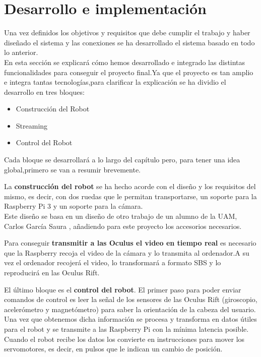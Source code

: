 \documentclass[twoside, 11pt]{epstfg}
\begin{document}
\chapter{Desarrollo e implementación}

Una vez definidos los objetivos y requisitos que debe cumplir el trabajo y haber diseñado el sistema y las conexiones se ha desarrollado el sistema basado en todo lo anterior.\\
En esta sección se explicará cómo hemos desarrollado e integrado las distintas funcionalidades para conseguir el proyecto final.Ya que el proyecto es tan amplio e integra tantas tecnologías,para clarificar la explicación se ha dividio el desarrollo en tres bloques:
\begin{itemize}
	\item Construcción del Robot
	\item Streaming 
	\item Control del Robot
\end{itemize}
Cada bloque se desarrollará a lo largo del capítulo pero, para tener una idea global,primero se van a resumir brevemente.

La \textbf{construcción del robot} se ha hecho acorde con el diseño y los requisitos del mismo, es decir, con dos ruedas que le permitan transportarse, un soporte para la Raspberry Pi 3 y un soporte para la cámara.\\
Este diseño se basa en un diseño de otro trabajo de un alumno de la UAM, Carlos García Saura \cite{garcia2012low}, añadiendo para este proyecto los accesorios necesarios.

Para conseguir \textbf{transmitir a las Oculus el video en tiempo real} es necesario que la Raspberry recoja el video de la cámara y lo transmita al ordenador.A su vez el ordenador recojerá el video, lo transformará a formato SBS y lo reproducirá en las Oculus Rift. 

El último bloque es el \textbf{control del robot}. El primer paso para poder enviar comandos de control es leer la señal de los sensores de las Oculus Rift (giroscopio, acelerómetro y magnetómetro) para saber la orientación de la cabeza del usuario.\\
Una vez que obtenemos dicha información se procesa y transforma en datos útiles para el robot y se transmite a las Raspberry Pi con la mínima latencia posible.\\
Cuando el robot recibe los datos los convierte en instrucciones para mover los servomotores, es decir, en pulsos que le indican un cambio de posición.
	
\end{document}

